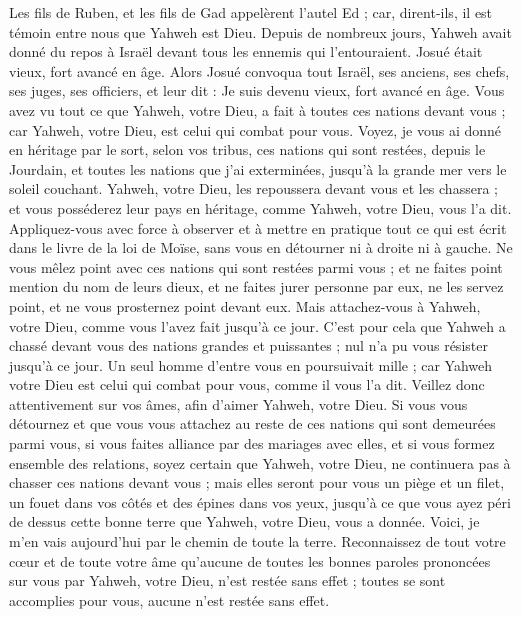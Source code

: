 \begin{multicols}{2}
Les fils de Ruben, et les fils de Gad appelèrent l’autel Ed ; car, dirent-ils, il est témoin entre nous que Yahweh est Dieu.
\VerseOne{}Depuis de nombreux jours, Yahweh avait donné du repos à Israël devant tous les ennemis qui l’entouraient. Josué était vieux, fort avancé en âge.
Alors Josué convoqua tout Israël, ses anciens, ses chefs, ses juges, ses officiers, et leur dit : Je suis devenu vieux, fort avancé en âge.
Vous avez vu tout ce que Yahweh, votre Dieu, a fait à toutes ces nations devant vous ; car Yahweh, votre Dieu, est celui qui combat pour vous.
Voyez, je vous ai donné en héritage par le sort, selon vos tribus, ces nations qui sont restées, depuis le Jourdain, et toutes les nations que j’ai exterminées, jusqu’à la grande mer vers le soleil couchant.
Yahweh, votre Dieu, les repoussera devant vous et les chassera ; et vous posséderez leur pays en héritage, comme Yahweh, votre Dieu, vous l’a dit.
Appliquez-vous avec force à observer et à mettre en pratique tout ce qui est écrit dans le livre de la loi de Moïse, sans vous en détourner ni à droite ni à gauche.
Ne vous mêlez point avec ces nations qui sont restées parmi vous ; et ne faites point mention du nom de leurs dieux, et ne faites jurer personne par eux, ne les servez point, et ne vous prosternez point devant eux.
Mais attachez-vous à Yahweh, votre Dieu, comme vous l’avez fait jusqu’à ce jour.
C’est pour cela que Yahweh a chassé devant vous des nations grandes et puissantes ; nul n’a pu vous résister jusqu’à ce jour.
Un seul homme d’entre vous en poursuivait mille ; car Yahweh votre Dieu est celui qui combat pour vous, comme il vous l’a dit.
Veillez donc attentivement sur vos âmes, afin d’aimer Yahweh, votre Dieu.
Si vous vous détournez et que vous vous attachez au reste de ces nations qui sont demeurées parmi vous, si vous faites alliance par des mariages avec elles, et si vous formez ensemble des relations,
soyez certain que Yahweh, votre Dieu, ne continuera pas à chasser ces nations devant vous ; mais elles seront pour vous un piège et un filet, un fouet dans vos côtés et des épines dans vos yeux, jusqu’à ce que vous ayez péri de dessus cette bonne terre que Yahweh, votre Dieu, vous a donnée.
Voici, je m’en vais aujourd’hui par le chemin de toute la terre. Reconnaissez de tout votre cœur et de toute votre âme qu’aucune de toutes les bonnes paroles prononcées sur vous par Yahweh, votre Dieu, n’est restée sans effet ; toutes se sont accomplies pour vous, aucune n’est restée sans effet.

\end{multicols}
